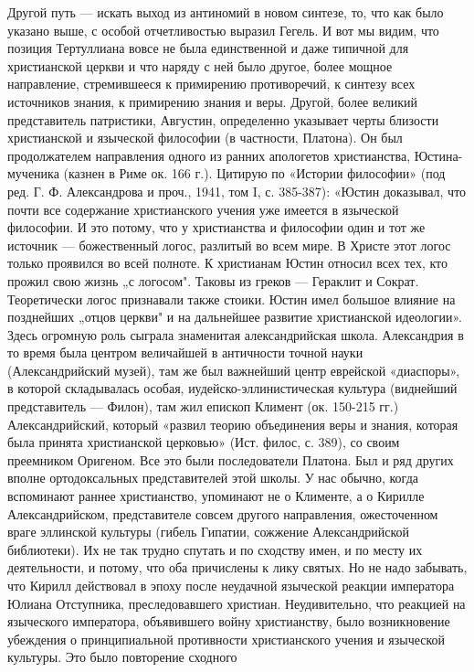 Другой путь --- искать выход из антиномий в новом синтезе, то, что как было
указано выше, с особой отчетливостью выразил Гегель. И вот мы видим, что
позиция Тертуллиана вовсе не была единственной и даже типичной для христианской
церкви и что наряду с ней было другое, более мощное направление, стремившееся к
примирению противоречий, к синтезу всех источников знания, к примирению знания
и веры. Другой, более великий представитель патристики, Августин, определенно
указывает черты близости христианской и языческой философии (в частности,
Платона). Он был продолжателем направления одного из ранних апологетов
христианства, Юстина-мученика (казнен в Риме ок. 166 г.). Цитирую по «Истории
философии» (под ред. Г. Ф. Александрова и проч., 1941, том I, с. 385-387):
«Юстин доказывал, что почти все содержание христианского учения уже имеется в
языческой философии. И это потому, что у христианства и философии один и тот же
источник --- божественный логос, разлитый во всем мире. В Христе этот логос
только проявился во всей полноте. К христианам Юстин относил всех тех, кто
прожил свою жизнь „с логосом". Таковы из греков --- Гераклит и Сократ.
Теоретически логос признавали также стоики. Юстин имел большое влияние на
позднейших „отцов церкви" и на дальнейшее развитие христианской идеологии».
Здесь огромную роль сыграла знаменитая александрийская школа. Александрия в то
время была центром величайшей в античности точной
науки (Александрийский музей), там же был важнейший центр еврейской «диаспоры»,
в которой складывалась особая, иудейско-эллинистическая культура (виднейший
представитель --- Филон), там жил епископ Климент (ок. 150-215 гг.)
Александрийский, который «развил теорию объединения веры и знания, которая была
принята христианской церковью» (Ист. филос, с. 389), со своим преемником
Оригеном. Все это были последователи Платона. Был и ряд других вполне
ортодоксальных представителей этой школы. У нас обычно, когда вспоминают раннее
христианство, упоминают не о Клименте, а о Кирилле Александрийском,
представителе совсем другого направления, ожесточенном враге эллинской культуры
(гибель Гипатии, сожжение Александрийской библиотеки). Их не так трудно спутать
и по сходству имен, и по месту их деятельности, и потому, что оба причислены к
лику святых. Но не надо забывать, что Кирилл действовал в эпоху после неудачной
языческой реакции императора Юлиана Отступника, преследовавшего христиан.
Неудивительно, что реакцией на языческого императора, объявившего войну
христианству, было возникновение убеждения о принципиальной противности
христианского учения и языческой культуры. Это было повторение сходного
